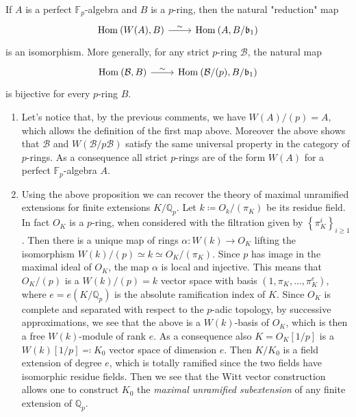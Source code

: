 \begin{prop}\label{UPWittVectors}
	If $A$ is a perfect $\mathbb{F}_p$-algebra and $B$ is a $p$-ring,
	then the natural "reduction" map 
	\begin{equation*}
	\begin{tikzcd}
		\mathrm{Hom}_{  } \left( W(A), B \right)
		\arrow[r, "\sim", rightarrow] &
		\mathrm{Hom}_{  } \left( A, B/\mathfrak{b}_1 \right)
	\end{tikzcd}
	\end{equation*}
	is an isomorphism.
	More generally, for any strict $p$-ring $\mathcal{B}$, the natural map
	\begin{equation*}
	\begin{tikzcd}
		\mathrm{Hom}_{  } \left( \mathcal{B}, B \right)
		\arrow[r, "\sim", rightarrow] &
		\mathrm{Hom}_{  } \left( \mathcal{B}/ (p), B/\mathfrak{b}_1 \right)
	\end{tikzcd}
	\end{equation*}
	is bijective for every $p$-ring $B$.
\end{prop}


\begin{rem}[]\leavevmode\vspace{-.2\baselineskip}
\begin{enumerate}
\item Let's notice that, by the previous comments, we have
	$W(A)/ (p) = A$, which allows the definition of the first map above.
	Moreover the above shows that $\mathcal{B}$ and $W(\mathcal{B}/p \mathcal{B})$
	satisfy the same universal property in the category of $p$-rings.
	As a consequence all strict $p$-rings are of the form $W(A)$ for
	a perfect $\mathbb{F}_p$-algebra $A$.

\item Using the above proposition we can recover the theory of maximal unramified
	extensions for finite extensions $K/\mathbb{Q}_p$.
	Let $k \coloneqq O_k/ (\pi_K)$ be its residue field.
	In fact $O_K$ is a $p$-ring, when considered with the filtration
	given by $\left\{ \pi_K^i \right\}_{i \geq 1}$.
	Then there is a unique map of rings $\alpha\colon W(k) \to O_K$
	lifting the isomorphism $W(k)/ (p) \simeq k \simeq O_K/ (\pi_K)$.
	Since $p$ has image in the maximal ideal of $O_K$,
	the map $\alpha$ is local and injective.
	This means that $O_K/ (p)$ is a $W(k)/ (p) = k$ vector space
	with basis $\left(1, \pi_K, \ldots, \pi_K^e\right)$,
	where $e = e(K/\mathbb{Q}_p)$ is the absolute ramification
	index of $K$.
	Since $O_K$ is complete and separated with respect to the $p$-adic topology,
	by successive approximations, we see that the above is a
	$W(k)$-basis of $O_K$, which is then a free $W(k)$-module
	of rank $e$.
	As a consequence also $K = O_K[1/p]$ is a $W(k)[1/p] \eqqcolon K_0$
	vector space of dimension $e$.
	Then $K/K_0$ is a field extension of degree $e$, which is totally ramified
	since the two fields have isomorphic residue fields.
	Then we see that the Witt vector construction allows one to
	construct $K_0$ the {\em maximal unramified subextension} of any
	finite extension of $\mathbb{Q}_p$.
\end{enumerate}
\end{rem}



